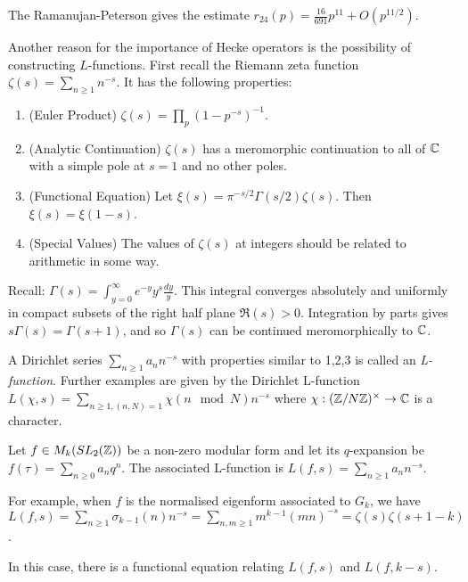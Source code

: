 \documentclass[10pt,a4paper]{article}
\begin{document}
The Ramanujan-Peterson gives the estimate $r_{24}(p) = \frac{16}{691}p^{11} + O(p^{11/2})$.

Another reason for the importance of Hecke operators is the possibility of constructing $L$-functions. First recall the Riemann zeta function $\zeta(s) = \sum_{n\geq 1} n^{-s}$. It has the following properties:
\begin{enumerate}
  \item (Euler Product) $\zeta(s) = \prod_p (1-p^{-s})^{-1}$.
  \item (Analytic Continuation) $\zeta(s)$ has a meromorphic continuation to all of $\mathbb{C}$ with a simple pole at $s=1$ and no other poles.
  \item (Functional Equation) Let $\xi(s) = \pi^{-s/2}\Gamma(s/2)\zeta(s)$. Then $\xi(s) = \xi(1-s)$.
  \item (Special Values) The values of $\zeta(s)$ at integers should be related to arithmetic in some way.
\end{enumerate}
Recall: $\Gamma(s) = \int_{y=0}^\infty e^{-y}y^s \frac{dy}{y}$. This integral converges absolutely and uniformly in compact subsets of the right half plane $\Re(s) > 0$. Integration by parts gives $s\Gamma(s) = \Gamma(s+1)$, and so $\Gamma(s)$ can be continued meromorphically to $\mathbb{C}$.

A Dirichlet series $\sum_{n \geq 1}a_n n^{-s}$ with properties similar to 1,2,3 is called an \emph{L-function}. Further examples are given by the Dirichlet L-function $L(\chi, s) = \sum_{n\geq 1, (n,N)=1} \chi(n \mod N)n^{-s}$ where $\chi : (\mathbb{Z}/N\mathbb{Z})^\times \to \mathbb{C}$ is a character.

\begin{definition}
  Let $f \in M_k(SL_2(\mathbb{Z}))$ be a non-zero modular form and let its $q$-expansion be $f(\tau) = \sum_{n\geq 0}a_n q^{n}$. The associated L-function is $L(f,s) = \sum_{n\geq 1} a_nn^{-s}$.
\end{definition}
For example, when $f$ is the normalised eigenform associated to $G_k$, we have $L(f,s) = \sum_{n\geq 1} \sigma_{k-1}(n)n^{-s} = \sum_{n,m \geq 1}m^{k-1}(mn)^{-s} = \zeta(s)\zeta(s+1-k)$.

In this case, there is a functional equation relating $L(f,s)$ and $L(f,k-s)$.
\end{document}
